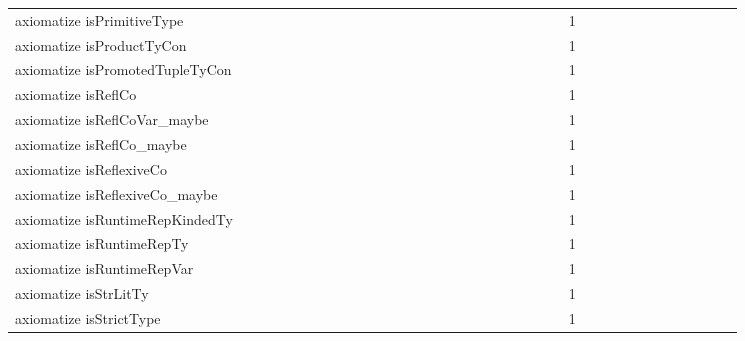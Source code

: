 {\begin{tabular}{l|rrr|rrr|rrr}
axiomatize isPrimitiveType &  &  &  &  &  &  &  &  &  &  &  &  &  &  &  &  &  &  &  &  &  &  &  & 1 &  &  &  &  &  &  &  &  &  &  &  & \\
axiomatize isProductTyCon &  &  &  &  &  &  &  &  &  &  &  &  &  &  &  &  &  &  &  &  &  &  &  & 1 &  &  &  &  &  &  &  &  &  &  &  & \\
axiomatize isPromotedTupleTyCon &  &  &  &  &  &  &  &  &  &  &  &  &  &  &  &  &  &  &  &  &  &  &  & 1 &  &  &  &  &  &  &  &  &  &  &  & \\
axiomatize isReflCo &  &  &  &  &  &  &  &  &  &  &  &  &  &  &  &  &  &  &  &  &  &  &  & 1 &  &  &  &  &  &  &  &  &  &  &  & \\
axiomatize isReflCoVar_maybe &  &  &  &  &  &  &  &  &  &  &  &  &  &  &  &  &  &  &  &  &  &  &  & 1 &  &  &  &  &  &  &  &  &  &  &  & \\
axiomatize isReflCo_maybe &  &  &  &  &  &  &  &  &  &  &  &  &  &  &  &  &  &  &  &  &  &  &  & 1 &  &  &  &  &  &  &  &  &  &  &  & \\
axiomatize isReflexiveCo &  &  &  &  &  &  &  &  &  &  &  &  &  &  &  &  &  &  &  &  &  &  &  & 1 &  &  &  &  &  &  &  &  &  &  &  & \\
axiomatize isReflexiveCo_maybe &  &  &  &  &  &  &  &  &  &  &  &  &  &  &  &  &  &  &  &  &  &  &  & 1 &  &  &  &  &  &  &  &  &  &  &  & \\
axiomatize isRuntimeRepKindedTy &  &  &  &  &  &  &  &  &  &  &  &  &  &  &  &  &  &  &  &  &  &  &  & 1 &  &  &  &  &  &  &  &  &  &  &  & \\
axiomatize isRuntimeRepTy &  &  &  &  &  &  &  &  &  &  &  &  &  &  &  &  &  &  &  &  &  &  &  & 1 &  &  &  &  &  &  &  &  &  &  &  & \\
axiomatize isRuntimeRepVar &  &  &  &  &  &  &  &  &  &  &  &  &  &  &  &  &  &  &  &  &  &  &  & 1 &  &  &  &  &  &  &  &  &  &  &  & \\
axiomatize isStrLitTy &  &  &  &  &  &  &  &  &  &  &  &  &  &  &  &  &  &  &  &  &  &  &  & 1 &  &  &  &  &  &  &  &  &  &  &  & \\
axiomatize isStrictType &  &  &  &  &  &  &  &  &  &  &  &  &  &  &  &  &  &  &  &  &  &  &  & 1 &  &  &  &  &  &  &  &  &  &  &  & \\

\end{tabular}}
